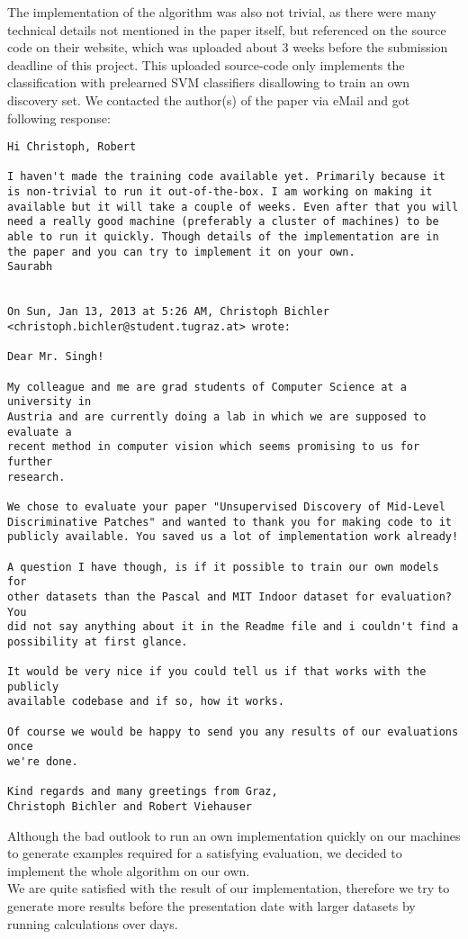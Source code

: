 The implementation of the algorithm was also not trivial, as there were many technical details not mentioned in the paper itself, but referenced on the source code on their website, which was uploaded about 3 weeks before the submission deadline of this project. This uploaded source-code only implements the classification with prelearned SVM classifiers disallowing to train an own discovery set. We contacted the author(s) of the paper via eMail and got following response:\\
\begin{verbatim}
Hi Christoph, Robert

I haven't made the training code available yet. Primarily because it
is non-trivial to run it out-of-the-box. I am working on making it
available but it will take a couple of weeks. Even after that you will
need a really good machine (preferably a cluster of machines) to be
able to run it quickly. Though details of the implementation are in
the paper and you can try to implement it on your own.
Saurabh


On Sun, Jan 13, 2013 at 5:26 AM, Christoph Bichler
<christoph.bichler@student.tugraz.at> wrote:

Dear Mr. Singh!

My colleague and me are grad students of Computer Science at a university in
Austria and are currently doing a lab in which we are supposed to evaluate a
recent method in computer vision which seems promising to us for further
research.

We chose to evaluate your paper "Unsupervised Discovery of Mid-Level
Discriminative Patches" and wanted to thank you for making code to it
publicly available. You saved us a lot of implementation work already!

A question I have though, is if it possible to train our own models for
other datasets than the Pascal and MIT Indoor dataset for evaluation? You
did not say anything about it in the Readme file and i couldn't find a
possibility at first glance.

It would be very nice if you could tell us if that works with the publicly
available codebase and if so, how it works.

Of course we would be happy to send you any results of our evaluations once
we're done.

Kind regards and many greetings from Graz,
Christoph Bichler and Robert Viehauser
\end{verbatim}

Although the bad outlook to run an own implementation quickly on our machines to generate examples required for a satisfying evaluation, we decided to implement the whole algorithm on our own.\\
We are quite satisfied with the result of our implementation, therefore we try to generate more results before the presentation date with larger datasets by running calculations over days.
